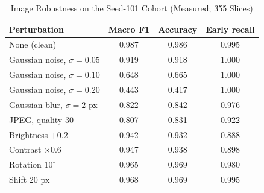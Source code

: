 \begin{table}[t]
\centering
\caption{Image Robustness on the Seed-101 Cohort (Measured; 355 Slices)}
\label{tab:robust}
\footnotesize
\begin{tabular}{@{}lccc@{}}
\toprule
Perturbation & Macro F1 & Accuracy & Early recall \\
\midrule
None (clean) & 0.987 & 0.986 & 0.995 \\
Gaussian noise, $\sigma=0.05$ & 0.919 & 0.918 & 1.000 \\
Gaussian noise, $\sigma=0.10$ & 0.648 & 0.665 & 1.000 \\
Gaussian noise, $\sigma=0.20$ & 0.443 & 0.417 & 1.000 \\
Gaussian blur, $\sigma=2$ px & 0.822 & 0.842 & 0.976 \\
JPEG, quality 30 & 0.807 & 0.831 & 0.922 \\
Brightness $+0.2$ & 0.942 & 0.932 & 0.888 \\
Contrast $\times0.6$ & 0.947 & 0.938 & 0.898 \\
Rotation $10^\circ$ & 0.965 & 0.969 & 0.980 \\
Shift 20 px & 0.968 & 0.969 & 0.995 \\
\bottomrule
\end{tabular}
\end{table}
